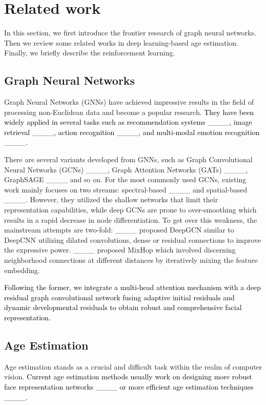\section{Related work}
\label{sec:sec2}
In this section, we first introduce the frontier research of graph neural networks. Then we review some related works in deep learning-based age estimation. Finally, we briefly describe the reinforcement learning.

\subsection{Graph Neural Networks}
Graph Neural Networks (GNNs) have achieved impressive results in the field of processing non-Euclidean data and become a popular research. \textcolor{black}{
They have been widely applied in several tasks such as recommendation systems ____, image retrieval ____, action recognition ____, and multi-modal emotion recognition ____.
}

There are several variants developed from GNNs, such as Graph Convolutional Neural Networks (GCNs) ____, Graph Attention Networks (GATs) ____, GraphSAGE ____ and so on. For the most commonly used GCNs, existing work mainly focuses on two streams: spectral-based ____ and spatial-based ____. However, they utilized the shallow networks that limit their representation capabilities, while deep GCNs are prone to over-smoothing which results in a rapid decrease in node differentiation. To get over this weakness, the mainstream attempts are two-fold:  ____ proposed DeepGCN similar to DeepCNN utilizing dilated convolutions, dense or residual connections to improve the expressive power. ____ proposed MixHop which involved discerning neighborhood connections at different distances by iteratively mixing the feature embedding. 

\textcolor{black}{
Following the former, we integrate a multi-head attention mechanism with a deep residual graph convolutional network fusing adaptive initial residuals and dynamic developmental residuals to obtain robust and comprehensive facial representation.
}

\subsection{Age Estimation}
Age estimation stands as a crucial and difficult task within the realm of computer vision. 
\textcolor{black}{
Current age estimation methods usually work on designing more robust face representation networks ____ or more efficient age estimation techniques ____.
}

